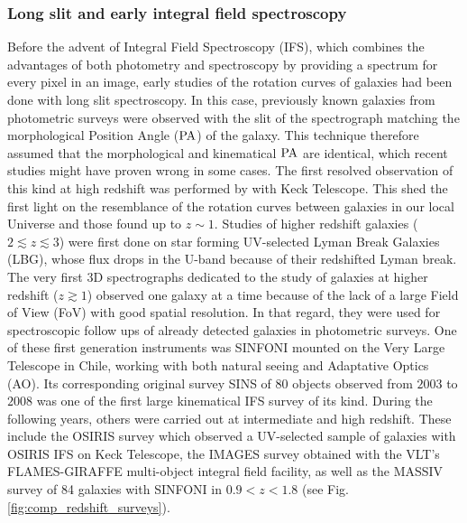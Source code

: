 \subsubsection{Long slit and early integral field spectroscopy}
\label{subsubsec:MUSE-VLT}

\begin{wrapfigure}{r}{0.5\linewidth}
	\centering
	\texttt{[image: \{Figures/comp\_redshift\_surveys]}.eps}
	\caption[Redshift distribution of the main IFS surveys]{Comparison of the redshift distribution of the main IFS surveys mentioned in the text from \shortciteA{Contini2012}.}
	\label{fig:comp_redshift_surveys}
\end{wrapfigure}

Before the advent of Integral Field Spectroscopy (IFS), which combines the advantages of both photometry and spectroscopy by providing a spectrum for every pixel in an image, early studies of the rotation curves of galaxies had been done with long slit spectroscopy. In this case, previously known galaxies from photometric surveys were observed with the slit of the spectrograph matching the morphological Position Angle ($\rm{PA}$) of the galaxy. This technique therefore assumed that the morphological and kinematical $\rm{PA}$ are identical, which recent studies might have proven wrong in some cases. The first resolved observation of this kind at high redshift was performed by  with Keck Telescope. This shed the first light on the resemblance of the rotation curves between galaxies in our local Universe and those found up to $z \sim 1$. Studies of higher redshift galaxies ($2 \lesssim z \lesssim 3$) were first done on star forming UV-selected Lyman Break Galaxies (LBG), whose flux drops in the U-band because of their redshifted Lyman break.  \\

The very first 3D spectrographs dedicated to the study of galaxies at higher redshift ($z \gtrsim 1$) observed one galaxy at a time because of the lack of a large Field of View (FoV) with good spatial resolution. In that regard, they were used for spectroscopic follow ups of already detected galaxies in photometric surveys. One of these first generation instruments was SINFONI  mounted on the Very Large Telescope in Chile, working with both natural seeing and Adaptative Optics (AO). Its corresponding original survey SINS  of $80$ objects observed from $2003$ to $2008$ was one of the first large kinematical IFS survey of its kind. During the following years, others were carried out at intermediate and high redshift. These include the OSIRIS survey  which observed a UV-selected sample of galaxies with OSIRIS IFS on Keck Telescope, the IMAGES survey  obtained with the VLT's FLAMES-GIRAFFE multi-object integral field facility, as well as the MASSIV survey  of 84 galaxies with SINFONI in $0.9 < z < 1.8$ (see Fig.\,\ref{fig:comp_redshift_surveys}).


